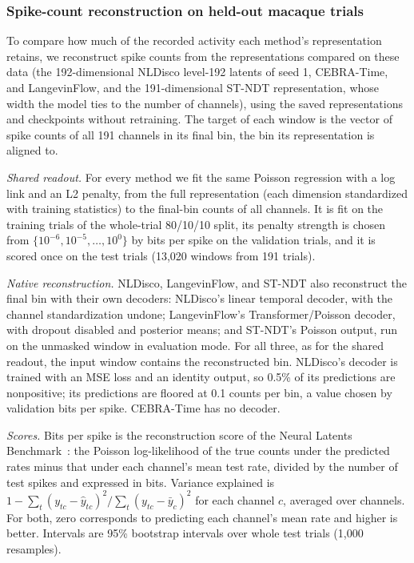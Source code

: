 \subsubsection{Spike-count reconstruction on held-out macaque trials}
\label{subsubsection:rebuttal_reconstruction}

To compare how much of the recorded activity each method's representation retains, we reconstruct spike counts from the representations compared on these data (the 192-dimensional NLDisco level-192 latents of seed 1, CEBRA-Time, and LangevinFlow, and the 191-dimensional ST-NDT representation, whose width the model ties to the number of channels), using the saved representations and checkpoints without retraining. The target of each window is the vector of spike counts of all 191 channels in its final bin, the bin its representation is aligned to.

\textit{Shared readout.} For every method we fit the same Poisson regression with a log link and an L2 penalty, from the full representation (each dimension standardized with training statistics) to the final-bin counts of all channels. It is fit on the training trials of the whole-trial 80/10/10 split, its penalty strength is chosen from $\{10^{-6},10^{-5},\dots,10^{0}\}$ by bits per spike on the validation trials, and it is scored once on the test trials (13,020 windows from 191 trials).

\textit{Native reconstruction.} NLDisco, LangevinFlow, and ST-NDT also reconstruct the final bin with their own decoders: NLDisco's linear temporal decoder, with the channel standardization undone; LangevinFlow's Transformer/Poisson decoder, with dropout disabled and posterior means; and ST-NDT's Poisson output, run on the unmasked window in evaluation mode. For all three, as for the shared readout, the input window contains the reconstructed bin. NLDisco's decoder is trained with an MSE loss and an identity output, so 0.5\% of its predictions are nonpositive; its predictions are floored at 0.1 counts per bin, a value chosen by validation bits per spike. CEBRA-Time has no decoder.

\textit{Scores.} Bits per spike is the reconstruction score of the Neural Latents Benchmark~\citep{pei_2022_nlb}: the Poisson log-likelihood of the true counts under the predicted rates minus that under each channel's mean test rate, divided by the number of test spikes and expressed in bits. Variance explained is $1-\sum_t (y_{tc}-\hat{y}_{tc})^2/\sum_t (y_{tc}-\bar{y}_c)^2$ for each channel $c$, averaged over channels. For both, zero corresponds to predicting each channel's mean rate and higher is better. Intervals are 95\% bootstrap intervals over whole test trials (1,000 resamples).

